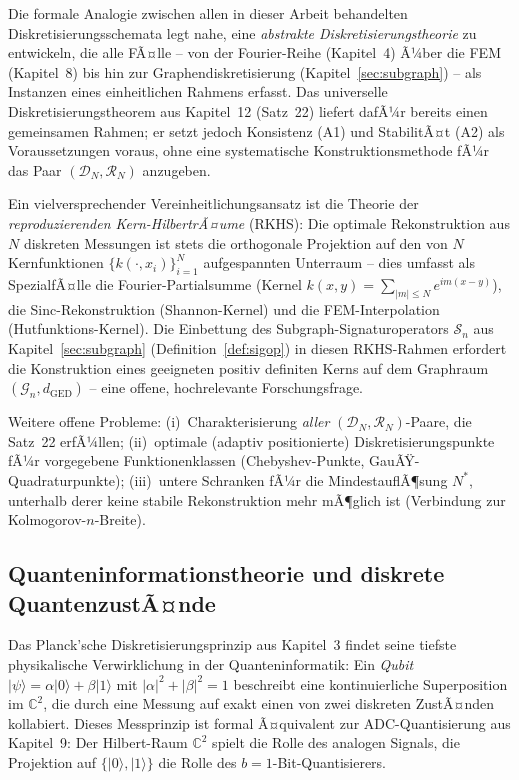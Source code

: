 ﻿\documentclass[a4paper,12pt]{article}
\theoremstyle{definition}
\begin{document}
Die formale Analogie zwischen allen in dieser Arbeit behandelten Diskretisierungsschemata
legt nahe, eine \emph{abstrakte Diskretisierungstheorie} zu entwickeln, die alle FÃ¤lle --
von der Fourier-Reihe (Kapitel~4) Ã¼ber die FEM (Kapitel~8) bis hin zur
Graphendiskretisierung (Kapitel~\ref{sec:subgraph}) -- als Instanzen eines einheitlichen
Rahmens erfasst. Das universelle Diskretisierungstheorem aus Kapitel~12 (Satz~22) liefert
dafÃ¼r bereits einen gemeinsamen Rahmen; er setzt jedoch Konsistenz (A1) und StabilitÃ¤t (A2)
als Voraussetzungen voraus, ohne eine systematische Konstruktionsmethode fÃ¼r das Paar
$(\mathcal{D}_N, \mathcal{R}_N)$ anzugeben.

Ein vielversprechender Vereinheitlichungsansatz ist die Theorie der
\emph{reproduzierenden Kern-HilbertrÃ¤ume} (RKHS): Die optimale Rekonstruktion aus $N$
diskreten Messungen ist stets die orthogonale Projektion auf den von $N$ Kernfunktionen
$\{k(\cdot, x_i)\}_{i=1}^N$ aufgespannten Unterraum -- dies umfasst als SpezialfÃ¤lle die
Fourier-Partialsumme (Kernel $k(x,y) = \sum_{|m|\leq N} e^{im(x-y)}$), die
Sinc-Rekonstruktion (Shannon-Kernel) und die FEM-Interpolation (Hutfunktions-Kernel).
Die Einbettung des Subgraph-Signaturoperators $\mathcal{S}_n$ aus
Kapitel~\ref{sec:subgraph} (Definition~\ref{def:sigop}) in diesen RKHS-Rahmen erfordert
die Konstruktion eines geeigneten positiv definiten Kerns auf dem Graphraum
$(\mathcal{G}_n, d_{\mathrm{GED}})$ -- eine offene, hochrelevante Forschungsfrage.

Weitere offene Probleme: (i)~Charakterisierung \emph{aller} $(\mathcal{D}_N, \mathcal{R}_N)$-Paare, die
Satz~22 erfÃ¼llen; (ii)~optimale (adaptiv positionierte) Diskretisierungspunkte fÃ¼r
vorgegebene Funktionenklassen (Chebyshev-Punkte, GauÃŸ-Quadraturpunkte); (iii)~untere
Schranken fÃ¼r die MindestauflÃ¶sung $N^*$, unterhalb derer keine stabile Rekonstruktion
mehr mÃ¶glich ist (Verbindung zur Kolmogorov-$n$-Breite).

\subsection{Quanteninformationstheorie und diskrete QuantenzustÃ¤nde}

Das Planck'sche Diskretisierungsprinzip aus Kapitel~3 findet seine tiefste physikalische
Verwirklichung in der Quanteninformatik: Ein \emph{Qubit} $|\psi\rangle = \alpha|0\rangle + \beta|1\rangle$
mit $|\alpha|^2 + |\beta|^2 = 1$ beschreibt eine kontinuierliche Superposition im
$\mathbb{C}^2$, die durch eine Messung auf exakt einen von zwei diskreten ZustÃ¤nden
kollabiert. Dieses Messprinzip ist formal Ã¤quivalent zur ADC-Quantisierung aus Kapitel~9:
Der Hilbert-Raum $\mathbb{C}^2$ spielt die Rolle des analogen Signals, die Projektion auf
$\{|0\rangle, |1\rangle\}$ die Rolle des $b=1$-Bit-Quantisierers.
\end{document}
